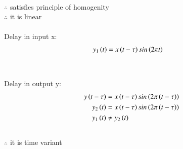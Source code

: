 \documentclass[journal,12pt,twocolumn]{IEEEtran}
\theoremstyle{remark}
\begin{document}
\\$\therefore$ satisfies principle of homogenity
\\$\therefore$ it is linear
\\\\Delay in input x:
\begin{align}
y_1\left(t\right)&=x\left(t-\tau\right)sin\left(2\pi t\right)
\end{align}
\\\\Delay in output y:
\begin{align}
y\left(t-\tau\right)&=x\left(t-\tau\right)sin\left(2\pi\left(t-\tau\right)\right)
\\y_2\left(t\right)&=x\left(t-\tau\right)sin\left(2\pi\left(t-\tau\right)\right)
\\y_1\left(t\right)&\neq y_2\left(t\right)
\end{align}
\\$\therefore$ it is time variant
\end{document}
